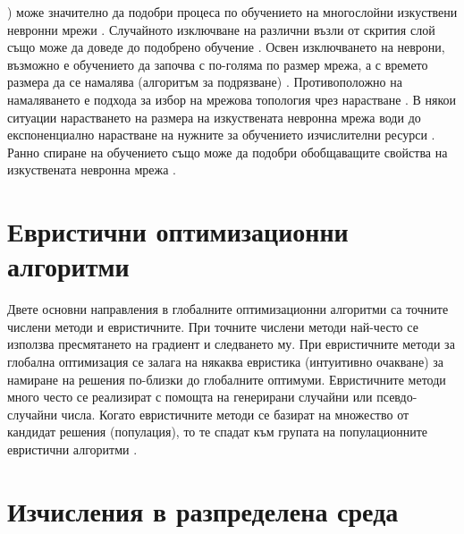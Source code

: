\cite{Zur-01}) може значително да подобри процеса по обучението на многослойни изкуствени невронни мрежи \cite{Sietsma-01}. Случайното изключване на различни възли от скрития слой също може да доведе до подобрено обучение \cite{Sequin-01}. Освен изключването на неврони, възможно е обучението да започва с по-голяма по размер мрежа, а с времето размера да се намалява (алгоритъм за подрязване) \cite{Karnin-01}. Противоположно на намаляването е подхода за избор на мрежова топология чрез нарастване \cite{Yao-01}. В някои ситуации нарастването на размера на изкуствената невронна мрежа води до експоненциално нарастване на нужните за обучението изчислителни ресурси \cite{Wilamowski-01}. Ранно спиране на обучението също може да подобри обобщаващите свойства на изкуствената невронна мрежа \cite{Coulibaly-01}.

\section{Евристични оптимизационни алгоритми}

Двете основни направления в глобалните оптимизационни алгоритми са точните числени методи и евристичните. При точните числени методи най-често се използва пресмятането на градиент и следването му. При евристичните методи за глобална оптимизация се залага на някаква евристика (интуитивно очакване) за намиране на решения по-близки до глобалните оптимуми. Евристичните методи много често се реализират с помощта на генерирани случайни или псевдо-случайни числа. Когато евристичните методи се базират на множество от кандидат решения (популация), то те спадат към групата на популационните евристични алгоритми \cite{Whitley-01}. 

\section{Изчисления в разпределена среда}


